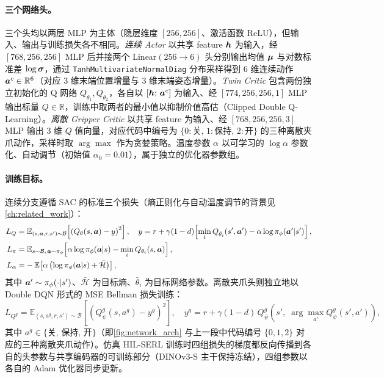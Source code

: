 \paragraph{三个网络头。}三个头均以两层 MLP 为主体（隐层维度 $[256, 256]$、激活函数 ReLU），但输入、输出与训练损失各不相同。\emph{连续 Actor} 以共享 feature $\bm{h}$ 为输入，经 $[768, 256, 256]$ MLP 后并接两个 Linear$(256 \to 6)$ 头分别输出均值 $\bm{\mu}$ 与对数标准差 $\log\bm{\sigma}$，通过 \texttt{TanhMultivariateNormalDiag} 分布采样得到 6 维连续动作 $\bm{a}^c \in \mathbb{R}^6$（对应 3 维末端位置增量与 3 维末端姿态增量）。\emph{Twin Critic} 包含两份独立初始化的 Q 网络 $Q_{\theta_1}, Q_{\theta_2}$，各自以 $[\bm{h};\, \bm{a}^c]$ 为输入、经 $[774, 256, 256, 1]$ MLP 输出标量 $Q \in \mathbb{R}$，训练中取两者的最小值以抑制价值高估（Clipped Double Q-Learning）。\emph{离散 Gripper Critic} 以共享 feature 为输入、经 $[768, 256, 256, 3]$ MLP 输出 3 维 $Q$ 值向量，对应代码中编号为 $\{0{:}\text{关},\, 1{:}\text{保持},\, 2{:}\text{开}\}$ 的三种离散夹爪动作，采样时取 $\arg\max$ 作为贪婪策略。温度参数 $\alpha$ 以可学习的 $\log\alpha$ 参数化、自动调节（初始值 $\alpha_0 = 0.01$），属于独立的优化器参数组。

\paragraph{训练目标。}连续分支遵循 SAC 的标准三个损失（熵正则化与自动温度调节的背景见\cref{ch:related_work}）：
\begin{align*}
  L_Q &= \mathbb{E}_{(s,\bm{a},r,s')\sim\mathcal{B}}\!\left[\left(Q_\theta(s,\bm{a}) - y\right)^2\right], \quad y = r + \gamma(1-d)\!\left[\min_i Q_{\bar{\theta}_i}(s', \bm{a}') - \alpha \log \pi_\phi(\bm{a}'|s')\right], \\
  L_\pi &= \mathbb{E}_{s\sim\mathcal{B},\, \bm{a}\sim\pi_\phi}\!\left[\alpha \log \pi_\phi(\bm{a}|s) - \min_i Q_{\theta_i}(s, \bm{a})\right], \\
  L_\alpha &= -\,\mathbb{E}\!\left[\alpha\left(\log \pi_\phi(\bm{a}|s) + \bar{\mathcal{H}}\right)\right],
\end{align*}
其中 $\bm{a}' \sim \pi_\phi(\cdot|s')$、$\bar{\mathcal{H}}$ 为目标熵、$\bar{\theta}_i$ 为目标网络参数。离散夹爪头则独立地以 Double DQN 形式的 MSE Bellman 损失训练：
\begin{equation*}
  L_{Q^g} = \mathbb{E}_{(s, a^g, r, s')\sim\mathcal{B}}\!\left[\left(Q^g_\psi(s, a^g) - y^g\right)^2\right], \quad y^g = r + \gamma(1-d)\, Q^g_{\bar{\psi}}\!\left(s',\; \arg\max_{a'} Q^g_\psi(s', a')\right),
\end{equation*}
其中 $a^g \in \{\text{关},\, \text{保持},\, \text{开}\}$（即\cref{fig:network_arch} 与上一段中代码编号 $\{0, 1, 2\}$ 对应的三种离散夹爪动作）。仿真 HIL-SERL 训练时四组损失的梯度都反向传播到各自的头参数与共享编码器的可训练部分（DINOv3-S 主干保持冻结），四组参数以各自的 Adam 优化器同步更新。

